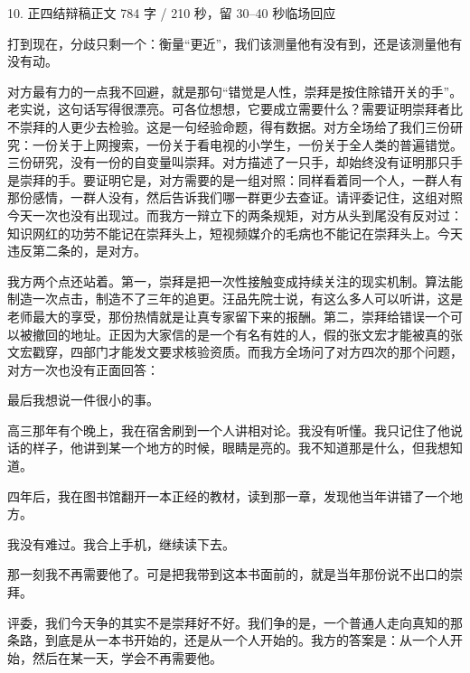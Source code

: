\documentclass[script,pro]{debate}
\begin{document}
\begin{speech}{10. 正四结辩稿}{正文 784 字 / 210 秒，留 30–40 秒临场回应}

打到现在，分歧只剩一个：衡量“更近”，我们该测量他有没有到，还是该测量他有没有动。

对方最有力的一点我不回避，就是那句“错觉是人性，崇拜是按住除错开关的手”。老实说，这句话写得很漂亮。可各位想想，它要成立需要什么？需要证明崇拜者比不崇拜的人更少去检验。这是一句经验命题，得有数据。对方全场给了我们三份研究：一份关于上网搜索，一份关于看电视的小学生，一份关于全人类的普遍错觉。三份研究，没有一份的自变量叫崇拜。对方描述了一只手，却始终没有证明那只手是崇拜的手。要证明它是，对方需要的是一组对照：同样看着同一个人，一群人有那份感情，一群人没有，然后告诉我们哪一群更少去查证。请评委记住，这组对照今天一次也没有出现过。而我方一辩立下的两条规矩，对方从头到尾没有反对过：知识网红的功劳不能记在崇拜头上，短视频媒介的毛病也不能记在崇拜头上。今天违反第二条的，是对方。

我方两个点还站着。第一，崇拜是把一次性接触变成持续关注的现实机制。算法能制造一次点击，制造不了三年的追更。汪品先院士说，有这么多人可以听讲，这是老师最大的享受，那份热情就是让真专家留下来的报酬。第二，崇拜给错误一个可以被撤回的地址。正因为大家信的是一个有名有姓的人，假的张文宏才能被真的张文宏戳穿，四部门才能发文要求核验资质。而我方全场问了对方四次的那个问题，对方一次也没有正面回答：

最后我想说一件很小的事。

高三那年有个晚上，我在宿舍刷到一个人讲相对论。我没有听懂。我只记住了他说话的样子，他讲到某一个地方的时候，眼睛是亮的。我不知道那是什么，但我想知道。

四年后，我在图书馆翻开一本正经的教材，读到那一章，发现他当年讲错了一个地方。

我没有难过。我合上手机，继续读下去。

那一刻我不再需要他了。可是把我带到这本书面前的，就是当年那份说不出口的崇拜。

评委，我们今天争的其实不是崇拜好不好。我们争的是，一个普通人走向真知的那条路，到底是从一本书开始的，还是从一个人开始的。我方的答案是：从一个人开始，然后在某一天，学会不再需要他。

\begin{contingency}
\end{contingency}
\end{speech}
\end{document}
